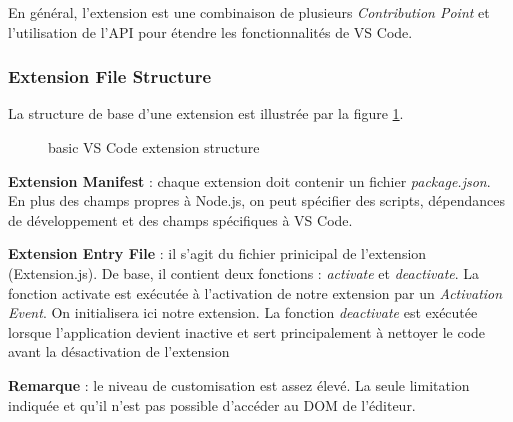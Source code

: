 \documentclass[
    iict, %
    il, %
]{heig-tb}
\begin{document}
En général, l'extension est une combinaison de plusieurs \emph{Contribution Point} et l'utilisation de l'API pour étendre les fonctionnalités de VS Code.

\subsubsection{Extension File Structure}\label{Extension File Structure}

La structure de base d'une extension est illustrée par la figure \ref{basic VS Code extension structure}.

\begin{figure}[H] %
    \centering
    \caption[basic VS Code extension structure]{\label{basic VS Code extension structure} basic VS Code extension structure}
\end{figure}

\textbf{Extension Manifest} :
chaque extension doit contenir un fichier \emph{package.json}. En plus des champs propres à Node.js, on peut spécifier des scripts, dépendances de développement et des champs spécifiques à VS Code.

\textbf{Extension Entry File} :
il s'agit du fichier prinicipal de l'extension (Extension.js).
De base, il contient deux fonctions : \emph{activate} et \emph{deactivate}.
La fonction activate est exécutée à l'activation de notre extension par un \emph{Activation Event}. On initialisera ici notre extension.
La fonction \emph{deactivate} est exécutée lorsque l'application devient inactive et sert principalement à nettoyer le code avant la désactivation de l'extension

\textbf{Remarque} : le niveau de customisation est assez élevé. La seule limitation indiquée et qu'il n'est pas possible d'accéder au DOM de l'éditeur.
\end{document}
